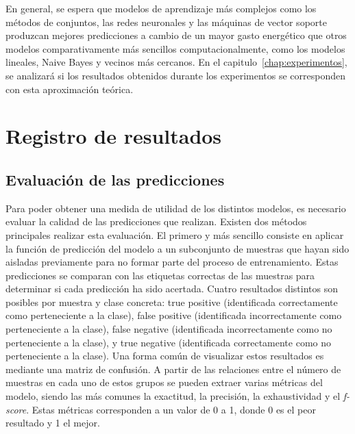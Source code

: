 En general, se espera que modelos de aprendizaje más complejos como los métodos de conjuntos, las redes neuronales y las máquinas de vector soporte produzcan mejores predicciones a cambio de un mayor gasto energético que otros modelos comparativamente más sencillos computacionalmente, como los modelos lineales, Naive Bayes y vecinos más cercanos. En el capitulo~\ref{chap:experimentos}, se analizará si los resultados obtenidos durante los experimentos se corresponden con esta aproximación teórica. 



\section{Registro de resultados}

\subsection{Evaluación de las predicciones}
\label{sec:scoring}


Para poder obtener una medida de utilidad de los distintos modelos, es necesario evaluar la calidad de las predicciones que realizan. Existen dos métodos principales realizar esta evaluación. El primero y más sencillo consiste en aplicar la función de predicción del modelo a un subconjunto de muestras que hayan sido aisladas previamente para no formar parte del proceso de entrenamiento. Estas predicciones se comparan con las etiquetas correctas de las muestras para determinar si cada predicción ha sido acertada.
Cuatro resultados distintos son posibles por muestra y clase concreta: true positive (identificada correctamente como perteneciente a la clase), false positive (identificada incorrectamente como perteneciente a la clase), false negative (identificada incorrectamente como no perteneciente a la clase), y true negative (identificada correctamente como no perteneciente a la clase). Una forma común de visualizar estos resultados es mediante una matriz de confusión. 
A partir de las relaciones entre el número de muestras en cada uno de estos grupos se pueden extraer varias métricas del modelo, siendo las más comunes la exactitud, la precisión, la exhaustividad y el \emph{f-score}\cite{scikit-model-eval}. Estas métricas corresponden a un valor de 0 a 1, donde 0 es el peor resultado y 1 el mejor.


